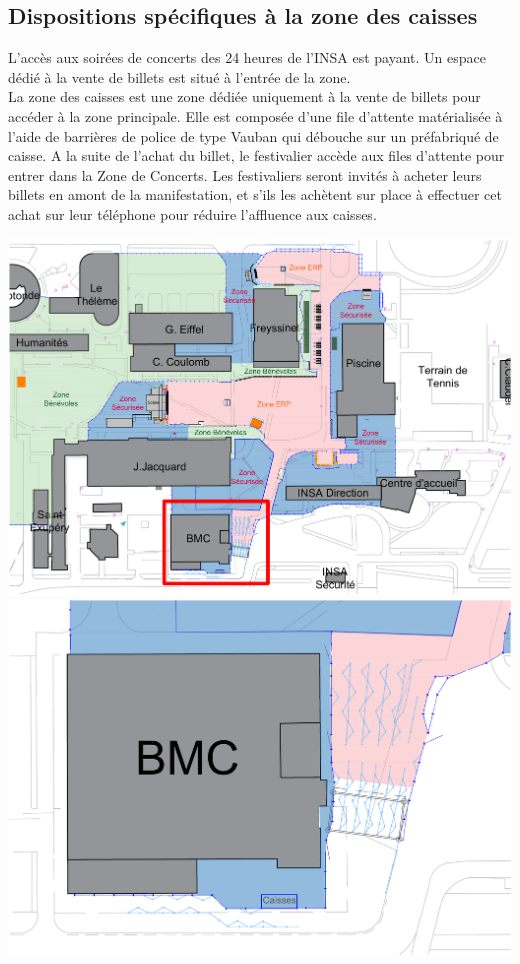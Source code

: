 \documentclass[hidelinks, paper=a4, fontsize=13pt]{report}
\begin{document}
\subsection{Dispositions spécifiques à la zone des caisses}
L’accès aux soirées de concerts des 24 heures de l’INSA est payant. Un espace dédié à la vente de billets est situé à l’entrée de la zone. \\
La zone des caisses est une zone dédiée uniquement à la vente de billets pour accéder à la zone principale. Elle est composée d'une file d’attente matérialisée à l’aide de barrières de police de type Vauban qui débouche sur un préfabriqué de caisse. A la suite de l'achat du billet, le festivalier accède aux files d'attente pour entrer dans la Zone de Concerts. Les festivaliers seront invités à acheter leurs billets en amont de la manifestation, et s'ils les achètent sur place à effectuer cet achat sur leur téléphone pour réduire l'affluence aux caisses.
\begin{center}
	\includegraphics[width=.8\textwidth,keepaspectratio]{Exports/Plan_24h_44eme-Entree}
	\includegraphics[width=.8\textwidth,keepaspectratio]{Exports/Plan_24h_44eme-Entree_zoom}
\end{center}
\end{document}
